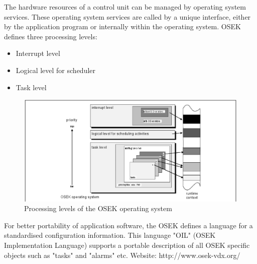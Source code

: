 The hardware resources of a control unit can be managed by operating system services. These
operating system services are called by a unique interface, either by the application program or
internally within the operating system.
OSEK defines three processing levels:
\begin{itemize}
\item  Interrupt level
\item Logical level for scheduler
\item Task level
\end{itemize}

\begin{figure}[htbp]
\begin{center}
\includegraphics[scale=0.4]{figures/nxtosek/osektask.eps}
\caption{Processing levels of the OSEK operating system}
\end{center}
\end{figure}
For better portability of application software, the OSEK defines a language for a standardised
configuration information. This language "OIL" (OSEK Implementation Language) supports a
portable description of all OSEK specific objects such as "tasks" and "alarms" etc.
Website: http://www.osek-vdx.org/
